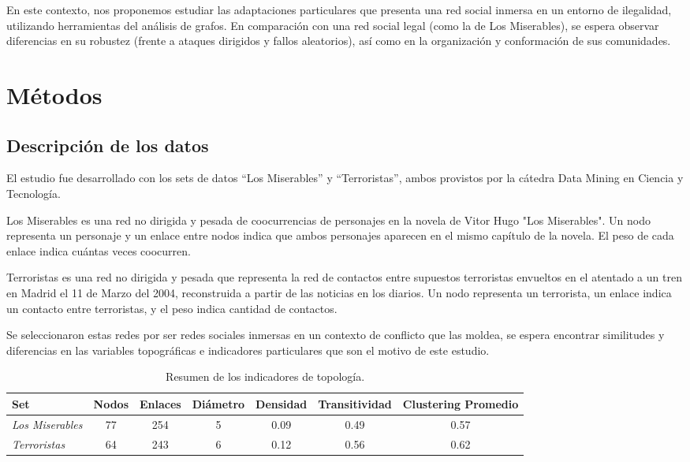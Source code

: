 \documentclass{article}
\begin{document}
En este contexto, nos proponemos estudiar las adaptaciones particulares que presenta una red social inmersa en un entorno de ilegalidad, utilizando herramientas del análisis de grafos. En comparación con una red social legal (como la de Los Miserables), se espera observar diferencias en su robustez (frente a ataques dirigidos y fallos aleatorios), así como en la organización y conformación de sus comunidades.

\section{Métodos}

\subsection{Descripción de los datos}

El estudio fue desarrollado con los sets de datos “Los Miserables” y “Terroristas”, ambos provistos por la cátedra Data Mining en Ciencia y Tecnología.

Los Miserables es una red no dirigida y pesada de coocurrencias de personajes en la novela de Vitor Hugo "Los Miserables". Un nodo representa un personaje y un enlace entre nodos indica que ambos personajes aparecen en el mismo capítulo de la novela. El peso de cada enlace indica cuántas veces coocurren. 

Terroristas es una red no dirigida y pesada que representa la red de contactos entre supuestos terroristas envueltos en el atentado a un tren en Madrid el 11 de Marzo del 2004, reconstruida a partir de las noticias en los diarios. Un nodo representa un terrorista, un enlace indica un contacto entre terroristas, y el peso indica cantidad de contactos. 

Se seleccionaron estas redes por ser redes sociales inmersas en un contexto de conflicto que las moldea, se espera encontrar similitudes y diferencias en las variables topográficas e indicadores particulares que son el motivo de este estudio.

\begin{table}[h]
\centering
\begin{tabular}{lcccccc}
\toprule
Set & Nodos & Enlaces & Diámetro & Densidad & Transitividad & Clustering Promedio \\
\midrule
\textit{Los Miserables} & 77 & 254 & 5 & 0.09 & 0.49 & 0.57 \\
\textit{Terroristas}    & 64 & 243 & 6 & 0.12 & 0.56 & 0.62 \\
\bottomrule
\end{tabular}
\caption{Resumen de los indicadores de topología.}
\end{table}
\end{document}
